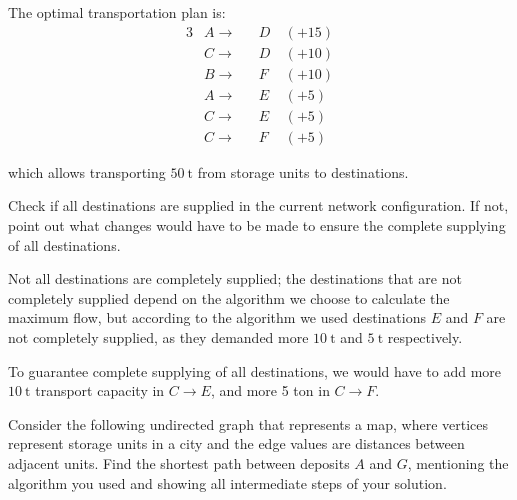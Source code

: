 {The optimal transportation plan is:
\begin{alignat*}{3}
    & A \rightarrow && D~& (+15) \\
    & C \rightarrow && D~& (+10) \\
    & B \rightarrow && F~& (+10) \\
    & A \rightarrow && E~& (+5) \\
    & C \rightarrow && E~& (+5) \\
    & C \rightarrow && F~& (+5)
\end{alignat*}

which allows transporting $\SI{50}{\tonne}$ from storage units to destinations.

Check if all destinations are supplied in the current network configuration. If not, point out what changes would have to be made to ensure the complete supplying of all destinations.

\ansseparator

Not all destinations are completely supplied; the destinations that are not completely supplied depend on the algorithm we choose to calculate the maximum flow, but according to the algorithm we used destinations $E$ and $F$ are not completely supplied, as they demanded more $\SI{10}{\tonne}$ and $\SI{5}{\tonne}$ respectively. 

To guarantee complete supplying of all destinations, we would have to add more $\SI{10}{\tonne}$ transport capacity in $C \rightarrow E$, and more 5 ton in $C \rightarrow F$.

Consider the following undirected graph that represents a map, where vertices represent storage units in a city and the edge values are distances between adjacent units. Find the shortest path between deposits $A$ and $G$, mentioning the algorithm you used and showing all intermediate steps of your solution.

\begin{center}
\end{center}}
